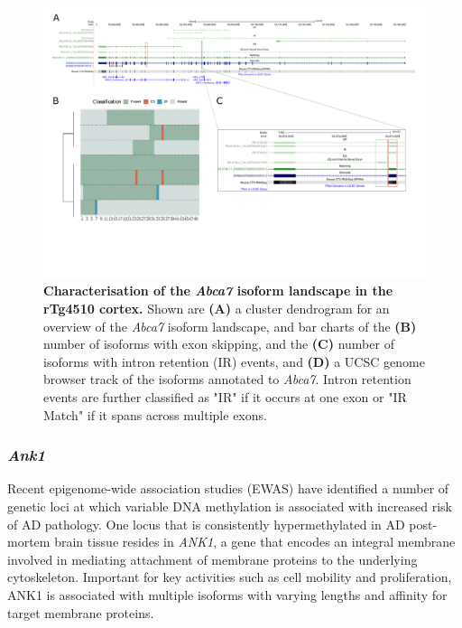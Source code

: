 \begin{landscape}
	\begin{figure}[htp]
		\centering
		\captionsetup{width=1.3\textwidth}
		\includegraphics[page=2,trim={0 1.5cm 0 0},scale = 0.85]{Figures/TargetGenes_Annotation_Landscape.pdf}
		\caption[Characterisation of the \textit{Abca7} isoform landscape]%
		{\textbf{Characterisation of the \textit{Abca7} isoform landscape in the rTg4510 cortex.} Shown are \textbf{(A)} a cluster dendrogram for an overview of the \textit{Abca7} isoform landscape, and bar charts of the \textbf{(B)} number of isoforms with exon skipping, and the \textbf{(C)} number of isoforms with intron retention (IR) events, and \textbf{(D)} a UCSC genome browser track of the isoforms annotated to \textit{Abca7}. Intron retention events are further classified as "IR" if it occurs at one exon or "IR Match" if it spans across multiple exons. }    
		\label{fig:abca7}
	\end{figure}
\end{landscape}
\restoregeometry

\subsubsection{\textit{Ank1}} 
\label{ch6: ank1}
Recent epigenome-wide association studies (EWAS) have identified a number of genetic loci at which variable DNA methylation is associated with increased risk of AD pathology\cite{Smith2019, Lunnon2014}. One locus that is consistently hypermethylated in AD post-mortem brain tissue resides in \textit{ANK1}, a gene that encodes an integral membrane involved in mediating attachment of membrane proteins to the underlying cytoskeleton\cite{Smith2019, Lunnon2014}. Important for key activities such as cell mobility and proliferation, ANK1 is associated with multiple isoforms with varying lengths and affinity for target membrane proteins.

